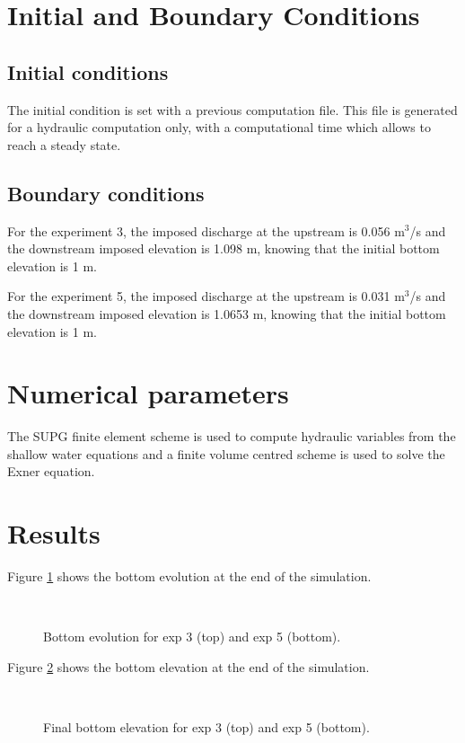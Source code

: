 \section{Initial and Boundary Conditions}

\subsection{Initial conditions}
%
The initial condition is set with a previous computation file. This file is generated for a hydraulic computation only, with a computational time which allows to reach a steady state.
%
\subsection{Boundary conditions}
%
For the experiment 3, the imposed discharge at the upstream is 0.056 m$^3$/s and the downstream imposed elevation is 1.098 m, knowing that the initial bottom elevation is 1 m.

For the experiment 5, the imposed discharge at the upstream is 0.031 m$^3$/s and the downstream imposed elevation is 1.0653 m, knowing that the initial bottom elevation is 1 m.
%
\section{Numerical parameters}
%
The SUPG finite element scheme is used to compute hydraulic variables from the shallow water equations and a finite volume centred scheme is used to solve the Exner equation.
%
\section{Results}
%
Figure \ref{guenter-t2d:fig:evol} shows the bottom evolution at the end of the simulation.

\begin{figure}[H]
 \centering
 \\
 \caption{Bottom evolution for exp 3 (top) and exp 5 (bottom).}
 \label{guenter-t2d:fig:evol}
\end{figure}

Figure \ref{guenter-t2d:fig:final} shows the bottom elevation at the end of the simulation.

\begin{figure}[H]
 \centering
 \\
 \caption{Final bottom elevation for exp 3 (top) and exp 5 (bottom).}
 \label{guenter-t2d:fig:final}
\end{figure}


